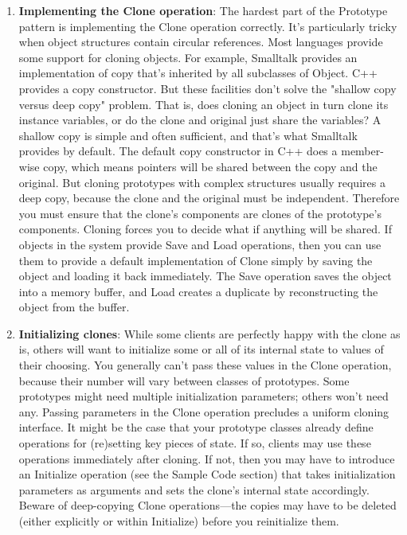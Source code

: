 \documentclass{report}
\begin{document}
\begin{itemize}
\begin{enumerate}
                \item \textbf{Implementing the Clone operation}: The hardest part of the Prototype pattern is implementing the Clone operation correctly. It's particularly tricky when object structures contain circular references.
                    \bigbreak \noindent 
                    Most languages provide some support for cloning objects. For example, Smalltalk provides an implementation of copy that's inherited by all subclasses of Object. C++ provides a copy constructor. But these facilities don't solve the "shallow copy versus deep copy" problem. That is, does cloning an object in turn clone its instance variables, or do the clone and original just share the variables?
                    \bigbreak \noindent 
                    A shallow copy is simple and often sufficient, and that's what Smalltalk provides by default. The default copy constructor in C++ does a member-wise copy, which means pointers will be shared between the copy and the original. But cloning prototypes with complex structures usually requires a deep copy, because the clone and the original must be independent. Therefore you must ensure that the clone's components are clones of the prototype's components. Cloning forces you to decide what if anything will be shared.
                    \bigbreak \noindent 
                    If objects in the system provide Save and Load operations, then you can use them to provide a default implementation of Clone simply by saving the object and loading it back immediately. The Save operation saves the object into a memory buffer, and Load creates a duplicate by reconstructing the object from the buffer.
                \item \textbf{Initializing clones}: While some clients are perfectly happy with the clone as is, others will want to initialize some or all of its internal state to values of their choosing. You generally can't pass these values in the Clone operation, because their number will vary between classes of prototypes. Some prototypes might need multiple initialization parameters; others won't need any. Passing parameters in the Clone operation precludes a uniform cloning interface.
                    \bigbreak \noindent 
                    It might be the case that your prototype classes already define operations for (re)setting key pieces of state. If so, clients may use these operations immediately after cloning. If not, then you may have to introduce an Initialize operation (see the Sample Code section) that takes initialization parameters as arguments and sets the clone's internal state accordingly. Beware of deep-copying Clone operations—the copies may have to be deleted (either explicitly or within Initialize) before you reinitialize them.

\end{enumerate}
\end{itemize}
\end{document}
